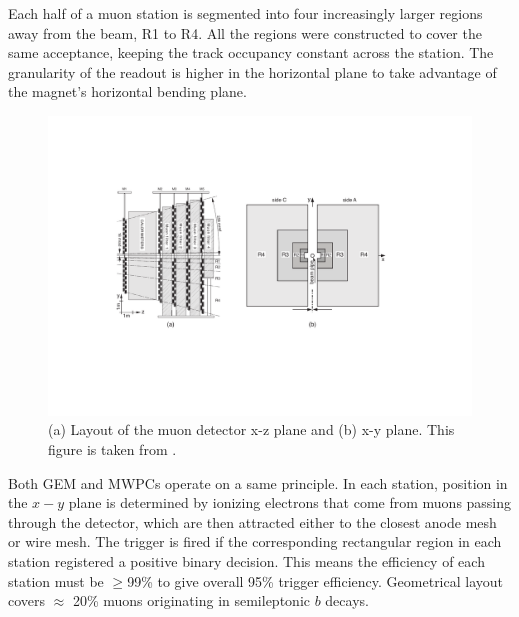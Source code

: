 Each half of a muon station is segmented into four increasingly larger regions away from the beam, R1 to R4.
 All the regions were constructed to cover the same acceptance, keeping the track occupancy constant across the station. The granularity of the readout is higher in the horizontal plane to take advantage of the magnet's horizontal bending plane.




\begin{figure}[!h]
	\centering
	\includegraphics[width = 1.0\textwidth]{figs/detector/sideview.pdf}%
	\caption{(a) Layout of the muon detector x-z plane and (b) x-y plane. This figure is taken from \cite{LHCb-DP-2012-002}. }  
	\label{fig:MuonGran}
\end{figure}

Both GEM and \Gls{MWPCs} operate on a same principle. In each station, position in the $x-y$ plane is determined by ionizing electrons that come from muons passing through the detector, which are then attracted either to the closest anode mesh or wire mesh. The trigger is fired if the corresponding rectangular region in each station registered a positive binary decision. This means the efficiency of each station must be $\geq$99\% to give overall 95\% trigger efficiency. Geometrical layout covers $\approx$ 20\% muons originating in semileptonic $b$ decays.


